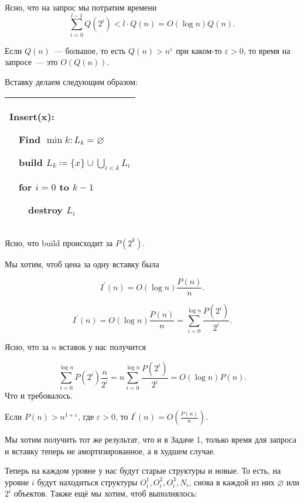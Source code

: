 Ясно, что на запрос мы потратим времени
\begin{equation*}
	\sum_{i = 0}^{l-1}Q(2^i) < l\cdot Q(n) = O(\log n)Q(n).
\end{equation*}


\begin{remark}
	Если $Q(n)$~--- большое, то есть $Q(n) > n^\varepsilon$ при каком-то $\varepsilon > 0$, то время на запросе~--- это $O(Q(n))$.
\end{remark}

Вставку делаем следующим образом:


\begin{tabular}{|p{5cm}|}
	\hline
	Insert(x):

	$\quad$Find $\min k: L_k = \varnothing$

	$\quad$build $L_k \coloneqq \{x\}\cup \bigcup_{i < k} L_i$

	$\quad$for $i = 0$ to $k-1$

	$\quad$$\quad$destroy $L_i$ \\

	\hline
\end{tabular}

Ясно, что build происходит за $P\left(2^k\right)$.


Мы хотим, чтоб цена за одну вставку была

\begin{equation*}
	I^\prime(n) = O(\log n )\frac{P(n)}{n}.
\end{equation*}

\begin{equation*}
	I^\prime(n) = O(\log n )\frac{P(n)}{n} = \sum_{i = 0}^{\log n}\frac{P(2^i)}{2^i}.
\end{equation*}

Ясно, что за $n$ вставок у нас получится

\begin{equation*}
	\sum_{i = 0}^{\log n}P\left(2^i\right)\frac{n}{2^i} = n \sum_{i = 0}^{\log n}\frac{P(2^i)}{2^i} = O(\log n)P(n).
\end{equation*}
Что и требовалось.


\begin{remark}
	Если $P(n) > n^{1 + \varepsilon}$, где $\varepsilon > 0$, то $I^\prime(n) = O\left(\frac{P(n)}{n}\right)$.
\end{remark}


\begin{task}
	Мы хотим получить тот же результат, что и в Задаче 1, только время для запроса и вставку теперь не амортизированное, а в худшем случае.
\end{task}
Теперь на каждом уровне у нас будут старые структуры и новые. То есть, на уровне $i$ будут находиться структуры $O_i^1,O_i^2,O_i^3,N_i$, снова в каждой из них $\varnothing$ или $2^i$ объектов. Также ещё мы хотим, чтоб выполнялось:

